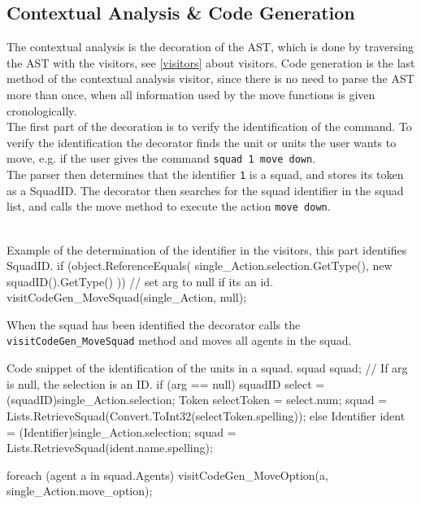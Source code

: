 \subsection{Contextual Analysis \& Code Generation}
\label{sec:ai_contextual_analysis}
The contextual analysis is the decoration of the AST, which is done by traversing the AST with the visitors, see \ref{visitors} about visitors. Code generation is the last method of the contextual analysis visitor, since there is no need to parse the AST more than once, when all information used by the move functions is given cronologically.\\
The first part of the decoration is to verify the identification of the command.
To verify the identification the decorator finds the unit or units the user wants to move, e.g. if the user gives the command \texttt{squad 1 move down}.\\
The parser then determines that the identifier \texttt{1} is a squad, and stores its token as a SquadID. The decorator then searches for the squad identifier in the squad list, and calls the move method to execute the action \texttt{move down}.\\
\\

\begin{source}{Example of the determination of the identifier in the visitors, this part identifies SquadID.}{}
if (object.ReferenceEquals(
	single_Action.selection.GetType(), 
	new squadID().GetType()
	))
	{
	// set arg to null if its an id.
	visitCodeGen_MoveSquad(single_Action, null);
	}
\end{source}

When the squad has been identified the decorator calls the \texttt{visitCodeGen\_MoveSquad} method and moves all agents in the squad.\\

\begin{source}{Code snippet of the identification of the units in a squad.}{}
squad squad;
// If arg is null, the selection is an ID.
if (arg == null)
	{
    squadID select = (squadID)single_Action.selection;
    Token selectToken = select.num;
    squad = Lists.RetrieveSquad(Convert.ToInt32(selectToken.spelling));
	}
else
    {
		Identifier ident = (Identifier)single_Action.selection;
		squad = Lists.RetrieveSquad(ident.name.spelling);
	}

	foreach (agent a in squad.Agents)
	{
		visitCodeGen_MoveOption(a, single_Action.move_option);
	}
\end{source}

